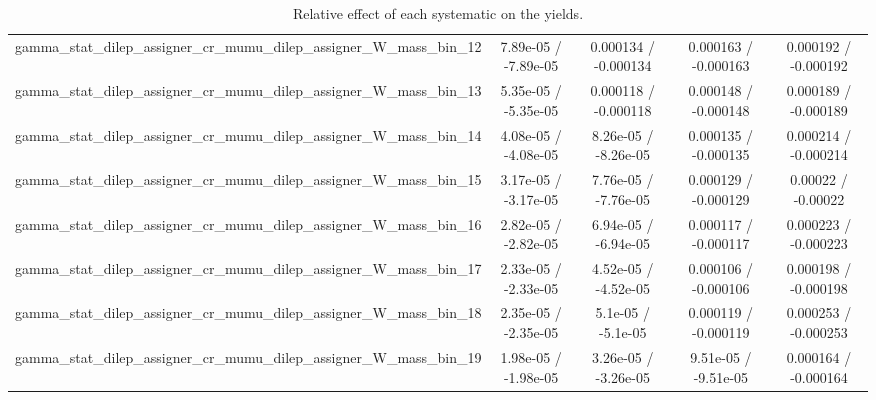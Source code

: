 \documentclass[10pt]{article}
\begin{document}
\begin{table}[htbp]
\begin{center}
\begin{tabular}{|c|c|c|c|c|}
  gamma_stat_dilep_assigner_cr_mumu_dilep_assigner_W_mass_bin_12 & 7.89e-05 / -7.89e-05 & 0.000134 / -0.000134 & 0.000163 / -0.000163 & 0.000192 / -0.000192 \\ 
  gamma_stat_dilep_assigner_cr_mumu_dilep_assigner_W_mass_bin_13 & 5.35e-05 / -5.35e-05 & 0.000118 / -0.000118 & 0.000148 / -0.000148 & 0.000189 / -0.000189 \\ 
  gamma_stat_dilep_assigner_cr_mumu_dilep_assigner_W_mass_bin_14 & 4.08e-05 / -4.08e-05 & 8.26e-05 / -8.26e-05 & 0.000135 / -0.000135 & 0.000214 / -0.000214 \\ 
  gamma_stat_dilep_assigner_cr_mumu_dilep_assigner_W_mass_bin_15 & 3.17e-05 / -3.17e-05 & 7.76e-05 / -7.76e-05 & 0.000129 / -0.000129 & 0.00022 / -0.00022 \\ 
  gamma_stat_dilep_assigner_cr_mumu_dilep_assigner_W_mass_bin_16 & 2.82e-05 / -2.82e-05 & 6.94e-05 / -6.94e-05 & 0.000117 / -0.000117 & 0.000223 / -0.000223 \\ 
  gamma_stat_dilep_assigner_cr_mumu_dilep_assigner_W_mass_bin_17 & 2.33e-05 / -2.33e-05 & 4.52e-05 / -4.52e-05 & 0.000106 / -0.000106 & 0.000198 / -0.000198 \\ 
  gamma_stat_dilep_assigner_cr_mumu_dilep_assigner_W_mass_bin_18 & 2.35e-05 / -2.35e-05 & 5.1e-05 / -5.1e-05 & 0.000119 / -0.000119 & 0.000253 / -0.000253 \\ 
  gamma_stat_dilep_assigner_cr_mumu_dilep_assigner_W_mass_bin_19 & 1.98e-05 / -1.98e-05 & 3.26e-05 / -3.26e-05 & 9.51e-05 / -9.51e-05 & 0.000164 / -0.000164 \\ 
\hline 
\end{tabular} 
\caption{Relative effect of each systematic on the yields.} 
\end{center} 
\end{table} 
\end{document}
